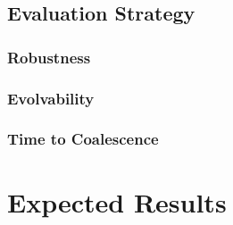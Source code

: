 \subsection{Evaluation Strategy}
\subsubsection{Robustness}
\subsubsection{Evolvability}
\subsubsection{Time to Coalescence}

\section{Expected Results}




